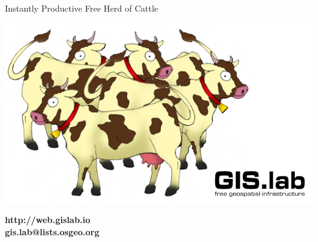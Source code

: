 \documentclass[12pt]{beamer}
\begin{document}
\begin{frame}[plain]{Instantly Productive Free Herd of Cattle}
	\begin{center}
		\includegraphics[keepaspectratio=true,width=\textwidth]{images/cows.png}
	\end{center}
\end{frame}

\begin{frame}[plain]
	\begin{center}
		\textbf{http://web.gislab.io}\\
		\textbf{gis.lab@lists.osgeo.org}
	\end{center}
\end{frame}


\end{document}
